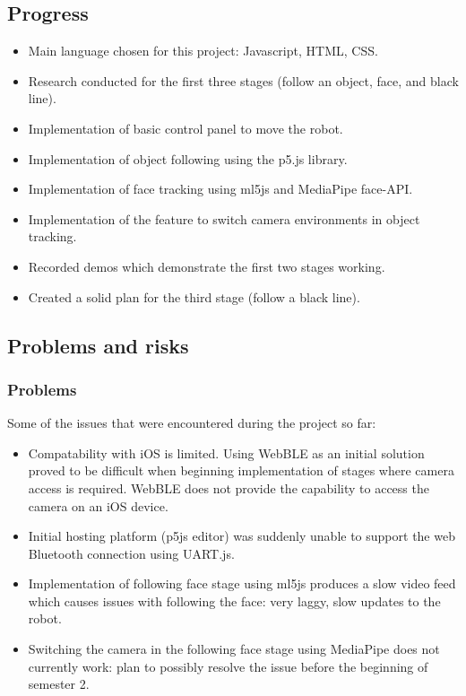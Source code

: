 \documentclass[11pt]{article}
\begin{document}
\subsection{Progress}\label{progress}

\begin{itemize}
\item Main language chosen for this project: Javascript, HTML, CSS. 
\item Research conducted for the first three stages (follow an object, 
face, and black line).
\item Implementation of basic control panel to move the robot.
\item Implementation of object following using the p5.js library.
\item Implementation of face tracking using ml5js and MediaPipe face-API.
\item Implementation of the feature to switch camera environments in 
object tracking. 
\item Recorded demos which demonstrate the first two stages working. 
\item Created a solid plan for the third stage (follow a black line).
\end{itemize}


\subsection{Problems and risks}\label{problems-and-risks}

\subsubsection{Problems}\label{problems}

Some of the issues that were encountered during the project so far:

\begin{itemize}
\item Compatability with iOS is limited. Using WebBLE as an initial 
solution proved to be difficult when beginning implementation of stages 
where camera access is required. WebBLE does not provide the capability to 
access the camera on an iOS device. 
\item Initial hosting platform (p5js editor) was suddenly unable to support 
the web Bluetooth connection using UART.js.
\item Implementation of following face stage using ml5js produces a slow video 
feed which causes issues with following the face: very laggy, slow updates to 
the robot.
\item Switching the camera in the following face stage using MediaPipe does 
not currently work: plan to possibly resolve the issue before the beginning of 
semester 2. 
\end{itemize}
\end{document}
